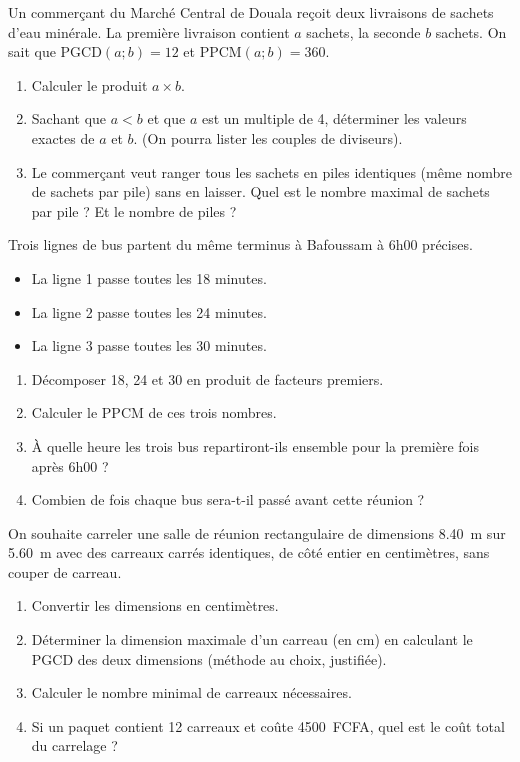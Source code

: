 \documentclass[11pt]{article}
\begin{document}
\begin{exercice}[Relation PGCD $\times$ PPCM = Produit]
Un commerçant du Marché Central de Douala reçoit deux livraisons de sachets d'eau minérale. La première livraison contient $a$ sachets, la seconde $b$ sachets. On sait que $\text{PGCD}(a; b) = 12$ et $\text{PPCM}(a; b) = 360$.
\begin{enumerate}
    \item Calculer le produit $a \times b$.
    \item Sachant que $a < b$ et que $a$ est un multiple de 4, déterminer les valeurs exactes de $a$ et $b$. (On pourra lister les couples de diviseurs).
    \item Le commerçant veut ranger tous les sachets en piles identiques (même nombre de sachets par pile) sans en laisser. Quel est le nombre maximal de sachets par pile ? Et le nombre de piles ?
\end{enumerate}
\end{exercice}

\begin{exercice}
Trois lignes de bus partent du même terminus à Bafoussam à 6h00 précises.
\begin{itemize}
    \item La ligne 1 passe toutes les 18 minutes.
    \item La ligne 2 passe toutes les 24 minutes.
    \item La ligne 3 passe toutes les 30 minutes.
\end{itemize}
\begin{enumerate}
    \item Décomposer 18, 24 et 30 en produit de facteurs premiers.
    \item Calculer le PPCM de ces trois nombres.
    \item À quelle heure les trois bus repartiront-ils ensemble pour la première fois après 6h00 ?
    \item Combien de fois chaque bus sera-t-il passé avant cette réunion ?
\end{enumerate}
\end{exercice}

\begin{exercice}
On souhaite carreler une salle de réunion rectangulaire de dimensions \SI{8,40}{m} sur \SI{5,60}{m} avec des carreaux carrés identiques, de côté entier en centimètres, sans couper de carreau.
\begin{enumerate}
    \item Convertir les dimensions en centimètres.
    \item Déterminer la dimension maximale d'un carreau (en cm) en calculant le PGCD des deux dimensions (méthode au choix, justifiée).
    \item Calculer le nombre minimal de carreaux nécessaires.
    \item Si un paquet contient 12 carreaux et coûte \SI{4500}{FCFA}, quel est le coût total du carrelage ?
\end{enumerate}
\end{exercice}
\end{document}
